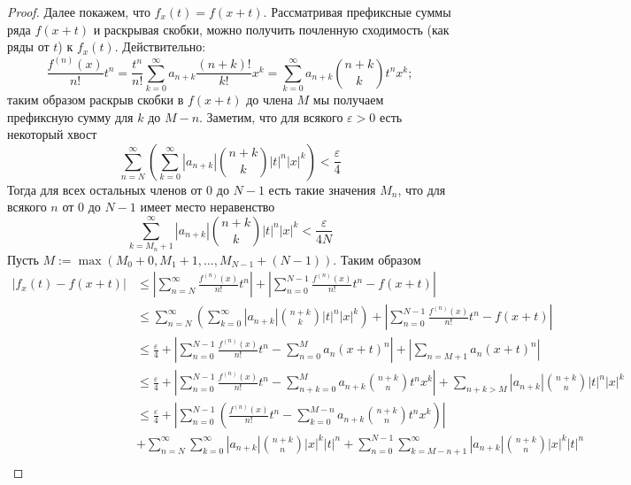 \documentclass[12pt,a4paper]{article}
\begin{document}
\begin{proof}
        Далее покажем, что $f_x(t) = f(x + t)$. Рассматривая префиксные суммы ряда $f(x + t)$ и раскрывая скобки, можно получить почленную сходимость (как ряды от $t$) к $f_x(t)$. Действительно:
        \[
            \frac{f^{(n)}(x)}{n!} t^n
            = \frac{t^n}{n!} \sum_{k=0}^\infty a_{n+k} \frac{(n+k)!}{k!} x^k
            = \sum_{k=0}^\infty a_{n+k} \binom{n+k}{k} t^n x^k;
        \]
        таким образом раскрыв скобки в $f(x + t)$ до члена $M$ мы получаем префиксную сумму для $k$ до $M - n$. Заметим, что для всякого $\varepsilon > 0$ есть некоторый хвост
        \[\sum_{n=N}^\infty \left(\sum_{k=0}^\infty |a_{n+k}| \binom{n+k}{k} |t|^n |x|^k\right) < \frac{\varepsilon}{4}\]
        Тогда для всех остальных членов от $0$ до $N-1$ есть такие значения $M_n$, что для всякого $n$ от $0$ до $N-1$ имеет место неравенство
        \[\sum_{k=M_n+1}^\infty |a_{n+k}| \binom{n+k}{k} |t|^n |x|^k < \frac{\varepsilon}{4N}\]
        Пусть $M := \max(M_0 + 0, M_1 + 1, \dots, M_{N-1} + (N-1))$. Таким образом
        \begin{align*}
            |f_x(t) - f(x + t)|
            &\leqslant
                \left|\sum_{n=N}^\infty \frac{f^{(n)}(x)}{n!}t^n\right|
                + \left|\sum_{n=0}^{N-1} \frac{f^{(n)}(x)}{n!}t^n - f(x + t)\right|\\
            &\leqslant
                \sum_{n=N}^\infty \left(\sum_{k=0}^\infty |a_{n+k}| \binom{n+k}{k} |t|^n |x|^k\right)
                + \left|\sum_{n=0}^{N-1} \frac{f^{(n)}(x)}{n!}t^n - f(x + t)\right|\\
            &\leqslant
                \frac{\varepsilon}{4}
                + \left|\sum_{n=0}^{N-1} \frac{f^{(n)}(x)}{n!}t^n - \sum_{n=0}^{M} a_n (x + t)^n\right|
                + \left|\sum_{n=M+1} a_n (x + t)^n\right|\\
            &\leqslant
                \frac{\varepsilon}{4}
                + \left|\sum_{n=0}^{N-1} \frac{f^{(n)}(x)}{n!}t^n - \sum_{n+k=0}^M a_{n+k} \binom{n+k}{n} t^n x^k\right|
                + \sum_{n+k>M} |a_{n+k}| \binom{n+k}{n} |t|^n |x|^k\\
            &\leqslant
                \frac{\varepsilon}{4}
                + \left|\sum_{n=0}^{N-1} \left(\frac{f^{(n)}(x)}{n!}t^n - \sum_{k=0}^{M-n} a_{n+k} \binom{n+k}{n} t^n x^k\right)\right|\\
                &+ \sum_{n=N}^\infty \sum_{k=0}^\infty |a_{n+k}| \binom{n+k}{n} |x|^k |t|^n
                + \sum_{n=0}^{N-1} \sum_{k=M-n+1}^\infty |a_{n+k}| \binom{n+k}{n} |x|^k |t|^n\\

\end{align*}
\end{proof}
\end{document}
